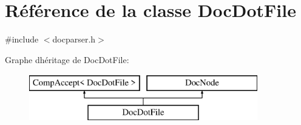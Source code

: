 \hypertarget{class_doc_dot_file}{}\section{Référence de la classe Doc\+Dot\+File}
\label{class_doc_dot_file}


{\ttfamily \#include $<$docparser.\+h$>$}

Graphe d\textquotesingle{}héritage de Doc\+Dot\+File\+:\begin{figure}[H]
\begin{center}
\leavevmode
\includegraphics[height=2.000000cm]{class_doc_dot_file}
\end{center}
\end{figure}
